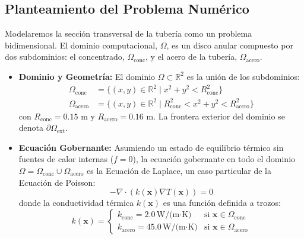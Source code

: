 \subsection{Planteamiento del Problema Numérico}
Modelaremos la sección transversal de la tubería como un problema bidimensional. El dominio computacional, \(\Omega\), es un disco anular compuesto por dos subdominios: el concentrado, \(\Omega_{\text{conc}}\), y el acero de la tubería, \(\Omega_{\text{acero}}\).

\begin{itemize}
    \item \textbf{Dominio y Geometría:} El dominio \(\Omega \subset \mathbb{R}^2\) es la unión de los subdominios:
    \begin{align*}
        \Omega_{\text{conc}} &= \{ (x,y) \in \mathbb{R}^2 \mid x^2 + y^2 < R_{\text{conc}}^2 \} \\
        \Omega_{\text{acero}} &= \{ (x,y) \in \mathbb{R}^2 \mid R_{\text{conc}}^2 < x^2 + y^2 < R_{\text{acero}}^2 \}
    \end{align*}
    con \(R_{\text{conc}} = 0.15\) m y \(R_{\text{acero}} = 0.16\) m. La frontera exterior del dominio se denota \(\partial\Omega_{\text{ext}}\).
    
    \item \textbf{Ecuación Gobernante:} Asumiendo un estado de equilibrio térmico sin fuentes de calor internas (\(f=0\)), la ecuación gobernante en todo el dominio \(\Omega = \Omega_{\text{conc}} \cup \Omega_{\text{acero}}\) es la Ecuación de Laplace, un caso particular de la Ecuación de Poisson:
    \[ -\nabla \cdot (k(\bm{x}) \nabla T(\bm{x})) = 0 \]
    donde la conductividad térmica \(k(\bm{x})\) es una función definida a trozos:
    \[
    k(\bm{x}) = 
    \begin{cases} 
    k_{\text{conc}} = 2.0\,\text{W/(m·K)} & \text{si } \bm{x} \in \Omega_{\text{conc}} \\
    k_{\text{acero}} = 45.0\,\text{W/(m·K)} & \text{si } \bm{x} \in \Omega_{\text{acero}} 
    \end{cases}
    \]
    

\end{itemize}

